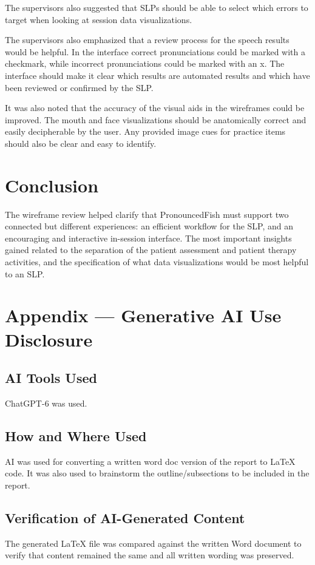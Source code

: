 \documentclass{article}
\begin{document}
The supervisors also suggested that SLPs should be able to select which errors to target when looking at session data visualizations.

The supervisors also emphasized that a review process for the speech results would be helpful. In the interface correct pronunciations could be marked with a checkmark, while incorrect pronunciations could be marked with an x. The interface should make it clear which results are automated results and which have been reviewed or confirmed by the SLP.

It was also noted that the accuracy of the visual aids in the wireframes could be improved. The mouth and face visualizations should be anatomically correct and easily decipherable by the user. Any provided image cues for practice items should also be clear and easy to identify.

\section{Conclusion}

The wireframe review helped clarify that PronouncedFish must support two connected but different experiences: an efficient workflow for the SLP, and an encouraging and interactive in-session interface. The most important insights gained related to the separation of the patient assessment and patient therapy activities, and the specification of what data visualizations would be most helpful to an SLP.

\newpage{}

\section{Appendix --- Generative AI Use Disclosure}

\subsection{AI Tools Used}

ChatGPT-6 was used.

\subsection{How and Where Used}

AI was used for converting a written word doc version of the report to LaTeX code. It was also used to brainstorm the outline/subsections to be included in the report. 

\subsection{Verification of AI-Generated Content}

The generated LaTeX file was compared against the written Word document to verify that content remained the same and all written wording was preserved.
\end{document}
